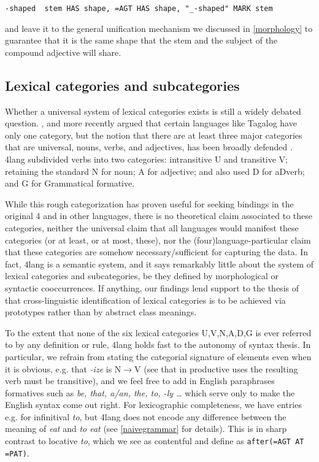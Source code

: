 \documentclass[11pt,bookmarks,bookmarksnumbered,naturalnames,plainpages=false,pdftex,colorlinks=true,urlcolor=blue,bookmarksdepth=subsection,plainpages=false]{paper}
\begin{document}
\begin{verbatim}
-shaped  stem HAS shape, =AGT HAS shape, "_-shaped" MARK stem
\end{verbatim}

\noindent
and leave it to the general unification mechanism we discussed in
\ref{morphology} to guarantee that it is the same shape that the stem and the
subject of the compound adjective will share. 

\subsection{Lexical categories and subcategories}\label{lexcat}

Whether a universal system of lexical categories exists is still a widely
debated question. \cite{Bloomfield:1933}, and more recently
\cite{Kaufman:2009} argued that certain languages like Tagalog have only one
category, but the notion that there are at least three major categories that
are universal, nouns, verbs, and adjectives, has been broadly defended
\citep{Baker:2003,Chung:2012}. 4lang subdivided verbs into two categories:
intransitive U and transitive V; retaining the standard N for noun; A for
adjective; and also used D for aDverb; and G for Grammatical formative.

While this rough categorization has proven useful for seeking bindings in the
original 4 and in other languages, there is no theoretical claim associated to
these categories, neither the universal claim that all languages would
manifest these categories (or at least, or at most, these), nor the
(four)language-particular claim that these categories are somehow
necessary/sufficient for capturing the data. In fact, 4lang is a semantic
system, and it says remarkably little about the system of lexical categories
and subcategories, be they defined by morphological or syntactic
cooccurrences. If anything, our findings lend support to the thesis of
\cite{Wierzbicka:2000} that cross-linguistic identification of lexical
categories is to be achieved via prototypes rather than by abstract class
meanings. 

To the extent that none of the six lexical categories U,V,N,A,D,G is ever
referred to by any definition or rule, 4lang holds fast to the autonomy of
syntax thesis. In particular, we refrain from stating the categorial signature
of elements even when it is obvious, e.g. that {\it -ize} is N$\rightarrow$V
(see \cite{Lieber:1992} that in productive uses the resulting verb must be
transitive), and we feel free to add in English paraphrases formatives such as
{\it be, that, a/an, the, to, -ly \ldots} which serve only to make the English
syntax come out right. For lexicographic completeness, we have entries
e.g. for infinitival {\it to}, but 4lang does not encode any difference
between the meaning of {\it eat} and {\it to eat} (see \ref{naivegrammar} for
details). This is in sharp contrast to locative {\it to}, which we see as
contentful and define as {\tt after(=AGT AT =PAT)}.
\end{document}
